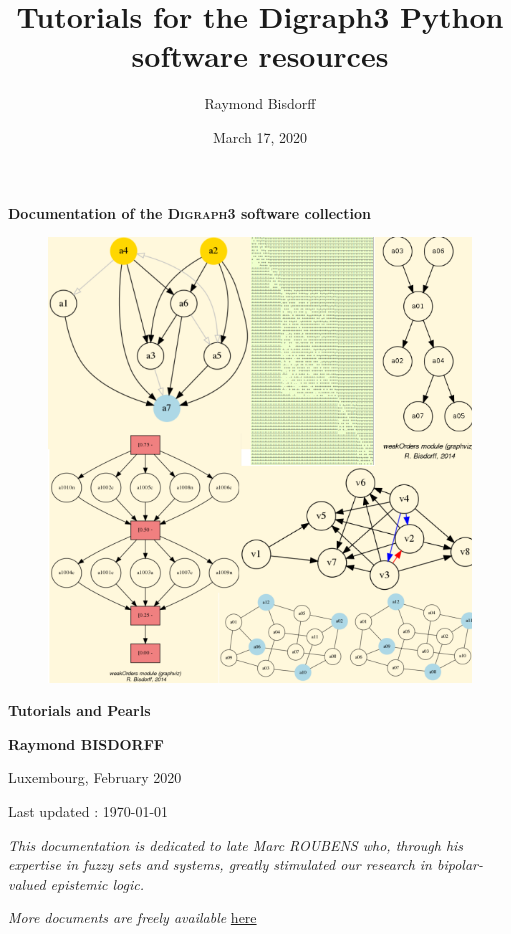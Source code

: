 \documentclass[a4paper,12pt,english]{sphinxhowto}
\title{Tutorials for the Digraph3 Python software resources}
\date{March 17, 2020}
\author{Raymond Bisdorff}
\begin{document}
\pagestyle{empty}


    \begin{titlepage}
        \centering

        \vspace*{10mm} %
        \textbf{\Large {Documentation of the \textsc{Digraph3} software collection}}

        \vspace{5mm}
        \begin{figure}[!h]
            \centering
            \includegraphics[scale=0.5]{introDoc3.png}
        \end{figure}

        \vspace{10mm}
        \textbf{\Huge {Tutorials and Pearls}}

        \textbf{Raymond BISDORFF}

        \small Luxembourg,  February 2020

        \small  Last updated : \today
        
        \vspace{10mm}
        \emph{This documentation is dedicated to late Marc ROUBENS who, through his expertise in fuzzy sets and systems, greatly stimulated our research in bipolar-valued epistemic logic.} 

        \vfill
        \textit{More documents are freely available }{\href{https://digraph3.readthedocs.io/en/latest}{here}}
    \end{titlepage}
\end{document}

